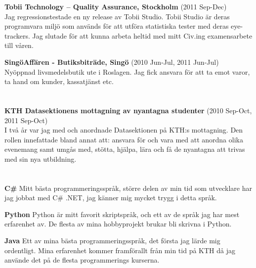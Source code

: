 \documentclass[margin,line]{resume}%
\begin{document}
\begin{resume}
		\textbf{Tobii Technology – Quality Assurance, Stockholm} (2011 Sep-Dec)\\
		Jag regressionstestade en ny release av Tobii Studio. Tobii Studio är deras
		programvara miljö som används för att utföra statistiska tester med deras
		eye-trackers. Jag slutade för att kunna arbeta heltid med mitt Civ.ing
		examensarbete till våren.

		\textbf{SingöAffären - Butiksbiträde, Singö} (2010 Jun-Jul, 2011 Jun-Jul)\\
		Nyöppnad livsmedelsbutik ute i Roslagen. Jag fick ansvara för att ta emot varor, ta
		hand om kunder, kassatjänst etc.

	\section{}\vspace{0.001mm}

		\textbf{KTH Datasektionens mottagning av nyantagna studenter} (2010
		Sep-Oct, 2011 Sep-Oct)\\
		I två år var jag med och anordnade Datasektionen på KTH:s mottagning. Den
		rollen innefattade bland annat att: ansvara för och vara med att anordna
		olika evenemang samt umgås med, stötta, hjälpa, lära och få de nyantagna att trivas
		med sin nya utbildning.

	   \section{}\vspace{0.001mm}

		\textbf{C\#}\hspace{0.5cm}
		Mitt bästa programmeringsspråk, större delen av min tid som utvecklare
		har jag jobbat med C\# .NET, jag känner mig mycket trygg i detta språk.

		\textbf{Python}\hspace{0.5cm}
		Python är mitt favorit skriptspråk, och ett av de språk jag har mest
		erfarenhet av. De flesta av mina hobbyprojekt brukar bli skrivna i Python.

		\textbf{Java}\hspace{0.5cm}
		Ett av mina bästa programmeringsspråk, det första jag lärde mig
		ordentligt. Mina erfarenhet kommer framförallt från min tid på KTH då
		jag använde det på de flesta programmerings kurserna.


\end{resume}
\end{document}
